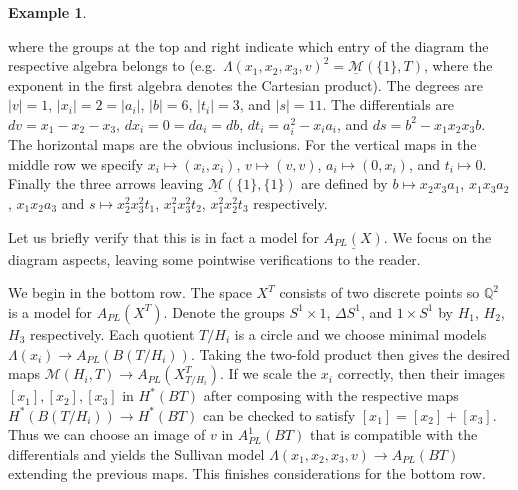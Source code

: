\documentclass[12pt,a4paper]{article}
\theoremstyle{definition}
\newtheorem{ex}[thm]{Example}
\begin{document}
\begin{ex}
\begin{center}
\end{center}
where the groups at the top and right indicate which entry of the diagram the respective algebra belongs to (e.g.\ $\Lambda(x_1,x_2,x_3,v)^2=\underline{\mathcal{M}}(\{1\},T)$, where the exponent in the first algebra denotes the Cartesian product). The degrees are $|v|=1$, $|x_i|=2=|a_i|$, $|b|=6$, $|t_i|=3$, and $|s|=11$. The differentials are $dv=x_1-x_2-x_3$, $dx_i=0=d a_i=db$, $dt_i=a_i^2-x_ia_i$, and $ds=b^2-x_1x_2x_3b$. The horizontal maps are the obvious inclusions. For the vertical maps in the middle row we specify $x_i\mapsto (x_i,x_i)$, $v\mapsto(v,v)$, $a_i\mapsto(0,x_i)$, and $t_i\mapsto 0$. Finally the three arrows leaving $\underline{\mathcal{M}}(\{1\},\{1\})$ are defined by $b\mapsto x_2x_3a_1$, $x_1x_3a_2$, $x_1x_2a_3$ and $s\mapsto x_2^2x_3^2t_1$, $x_1^2x_3^2t_2$, $x_1^2x_2^2t_3$ respectively.

Let us briefly verify that this is in fact a model for $\underline{A_{PL}(X)}$. We focus on the diagram aspects, leaving some pointwise verifications to the reader.

We begin in the bottom row. The space $X^T$ consists of two discrete points so $\mathbb{Q}^2$ is a model for $A_{PL}(X^T)$. Denote the groups $S^1\times 1$, $\Delta S^1$, and $1\times S^1$ by $H_1$, $H_2$, $H_3$ respectively. Each quotient $T/H_i$ is a circle and we choose minimal models $\Lambda(x_i)\rightarrow A_{PL}(B(T/H_i))$. Taking the two-fold product then gives the desired maps $\mathcal{M}(H_i,T)\rightarrow A_{PL}(X^T_{T/H_i})$. If we scale the $x_i$ correctly, then their images $[x_1],[x_2],[x_3]$ in $H^*(BT)$ after composing with the respective maps $H^*(B(T/H_i))\rightarrow H^*(BT)$ can be checked to satisfy $[x_1]=[x_2]+[x_3]$. Thus we can choose an image of $v$ in $A_{PL}^1(BT)$ that is compatible with the differentials and yields the Sullivan model $\Lambda(x_1,x_2,x_3,v)\rightarrow A_{PL}(BT)$ extending the previous maps. This finishes considerations for the bottom row.


\end{ex}
\end{document}
